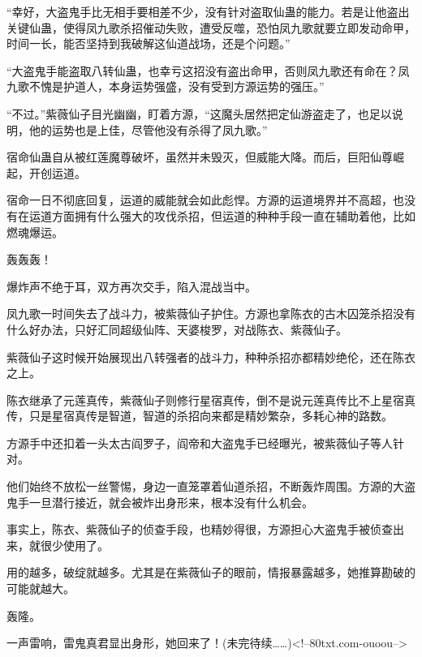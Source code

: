 \begin{this_body}
“幸好，大盗鬼手比无相手要相差不少，没有针对盗取仙蛊的能力。若是让他盗出关键仙蛊，使得凤九歌杀招催动失败，遭受反噬，恐怕凤九歌就要立即发动命甲，时间一长，能否坚持到我破解这仙道战场，还是个问题。”

“大盗鬼手能盗取八转仙蛊，也幸亏这招没有盗出命甲，否则凤九歌还有命在？凤九歌不愧是护道人，本身运势强盛，没有受到方源运势的强压。”

“不过。”紫薇仙子目光幽幽，盯着方源，“这魔头居然把定仙游盗走了，也足以说明，他的运势也是上佳，尽管他没有杀得了凤九歌。”

宿命仙蛊自从被红莲魔尊破坏，虽然并未毁灭，但威能大降。而后，巨阳仙尊崛起，开创运道。

宿命一日不彻底回复，运道的威能就会如此彪悍。方源的运道境界并不高超，也没有在运道方面拥有什么强大的攻伐杀招，但运道的种种手段一直在辅助着他，比如燃魂爆运。

轰轰轰！

爆炸声不绝于耳，双方再次交手，陷入混战当中。

凤九歌一时间失去了战斗力，被紫薇仙子护住。方源也拿陈衣的古木囚笼杀招没有什么好办法，只好汇同超级仙阵、天婆梭罗，对战陈衣、紫薇仙子。

紫薇仙子这时候开始展现出八转强者的战斗力，种种杀招亦都精妙绝伦，还在陈衣之上。

陈衣继承了元莲真传，紫薇仙子则修行星宿真传，倒不是说元莲真传比不上星宿真传，只是星宿真传是智道，智道的杀招向来都是精妙繁杂，多耗心神的路数。

方源手中还扣着一头太古阎罗子，阎帝和大盗鬼手已经曝光，被紫薇仙子等人针对。

他们始终不放松一丝警惕，身边一直笼罩着仙道杀招，不断轰炸周围。方源的大盗鬼手一旦潜行接近，就会被炸出身形来，根本没有什么机会。

事实上，陈衣、紫薇仙子的侦查手段，也精妙得很，方源担心大盗鬼手被侦查出来，就很少使用了。

用的越多，破绽就越多。尤其是在紫薇仙子的眼前，情报暴露越多，她推算勘破的可能就越大。

轰隆。

一声雷响，雷鬼真君显出身形，她回来了！(未完待续……)<!--80txt.com-ouoou-->

\end{this_body}

